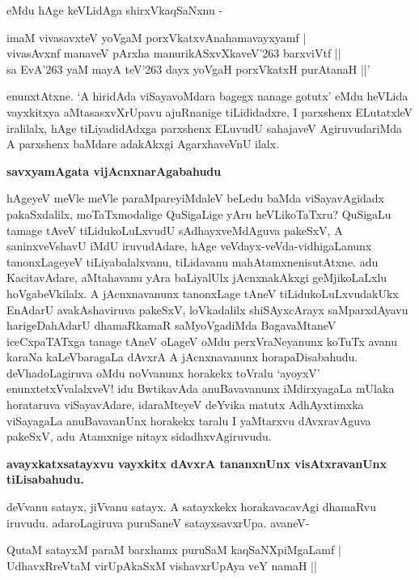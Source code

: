 \noindent
eMdu hAge keVLidAga shirxVkaqSaNxnu -

\begin{shloka}
imaM vivasavxteV yoVgaM porxVkatxvAnahamavayxyamf |\\\label{107}
vivasAvxnf manaveV pArxha manurikASxvXkaveV\char'263 barxviVtf ||\\
sa EvA\char'263 yaM mayA teV\char'263 dayx yoVgaH porxVkatxH purAtanaH ||'\label{107}
\end{shloka}

\noindent
enunxtAtxne. `A hiridAda viSayavoMdara bagegx nanage gotutx' eMdu heVLida vayxkitxya aMta\-sasxvX\-rU\-pavu ajuRnanige tiLididadxre, I parxshenx ELutatxleV iralilalx, hAge tiLiyadidAdxga parxshenx ELuvudU sahajaveV  AgiruvudariMda A parxshenx baMdare adakAkxgi AgarxhaveVnU ilalx.

{\bigskip
\noindent
{\large\bf savxyamAgata vijAcnxnarAgabahudu}}\label{page107}
\medskip

\noindent
hAgeyeV meVle meVle paraMpareyiMdaleV beLedu baMda viSayavAgidadx pakaSxdalilx, moTaTxmoda\-lige QuSigaLige yAru heVLikoTaTxru? QuSigaLu tamage tAveV tiLidukoLuLxvudU sAdhayxveMdAguva pakeSxV, A saninxveVshavU iMdU iruvudAdare, hAge veVdayx-veVda-vidhigaLanunx tanonxLageyeV tiLiyabalalx\-vanu, tiLidavanu mahAtamxnenisutAtxne. adu KacitavAdare, aMtahavanu yAra baLiyalUlx jAcnxnakAkxgi geMji\-koLaLxlu hoVgabeVkilalx. A jAcnxnavanunx tanonxLage tAneV tiLidukoLuLxvudakUkx EnAdarU avakAshaviruva pakeSxV, loVkadalilx shiSAyxcArayx saMparxdAyavu harigeDahAdarU dhamaRkamaR saMyoVgadiMda Baga\-vaM\-taneV iceCxpaTATxga tanage tAneV oLageV oMdu perxVraNeyanunx koTuTx avanu karaNa kaLeVbaragaLa dAvxrA A jAcnxnavanunx horapaDisabahudu. deVhadoLagiruva oMdu noVvanunx horakekx toVralu `ayoyxV' enunxtetxVvalalxveV! idu BwtikavAda anuBavavanunx iMdirxyagaLa mUlaka horataruva viSayavAdare, idaraMteyeV deYvika matutx AdhAyxtimxka viSayagaLa anuBavavanUnx horakekx taralu I yaMtarxvu dAvxravA\-guva pakeSxV, adu Atamxnige nitayx sidadhxvAgiruvudu.

{\bigskip
\noindent
{\large\bf avayxkatxsatayxvu vayxkitx dAvxrA tananxnUnx visAtxravanUnx tiLisabahudu.}}\label{page108}
\medskip

\noindent
deVvanu satayx, jiVvanu satayx. A satayxkekx horakavacavAgi dhamaRvu iruvudu. adaroLagiruva puru\-SaneV satayxsavxrUpa. avaneV-

\begin{shloka}
QutaM satayxM paraM barxhamx puruSaM kaqSaNXpiMgaLamf |\\\label{108}
UdhavxRreVtaM virUpAkaSxM vishavxrUpAya veY namaH ||
\end{shloka}

